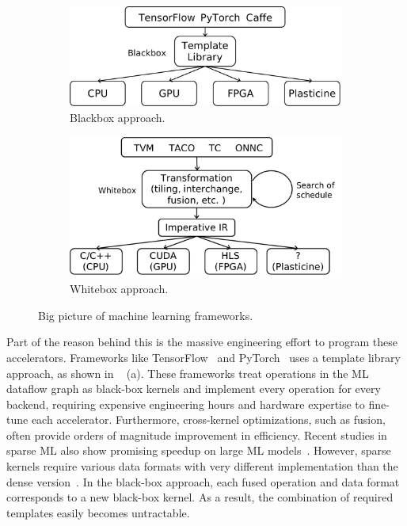 \begin{figure}
\centering
\begin{subfigure}[b]{0.48\textwidth}
\centering
\includegraphics[width=1\textwidth]{figs/blackbox.pdf}
\caption{
  Blackbox approach.
}
\end{subfigure}
\hfill
\begin{subfigure}[b]{0.48\textwidth}
\centering
\includegraphics[width=1\textwidth]{figs/whitebox.pdf}
\caption{
  Whitebox approach.
}
\end{subfigure}
\caption[Big picture of machine learning frameworks]{
  Big picture of machine learning frameworks.
}
\label{fig:bigpic}
\end{figure}

Part of the reason behind this is the massive engineering effort to program these accelerators.
Frameworks like TensorFlow~\cite{tensorflow} and PyTorch~\cite{caffe} uses a template library
approach, as shown in ~ (a).
These frameworks treat operations in the ML dataflow graph as black-box kernels and implement
every operation for every backend, requiring expensive engineering hours and hardware expertise to
fine-tune each accelerator.
Furthermore, cross-kernel optimizations, such as fusion, often provide orders of magnitude improvement in efficiency.
Recent studies in sparse ML also show promising speedup on large ML models~\cite{eie}. 
However, sparse kernels require various data formats with very different implementation than the dense
version~\cite{tacosparse}.
In the black-box approach, each fused operation and data format corresponds to a new black-box
kernel.
As a result, the combination of required templates easily becomes untractable.

